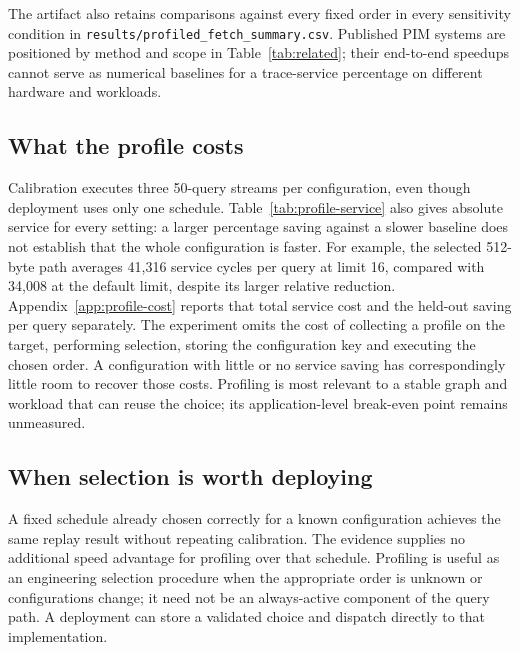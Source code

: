 \begin{table}[htbp]\centering\small
\caption[Profiled path versus measured baselines]{Default memory configuration and expansion boundaries. Mean paired cycle difference (\%) and 95\% interval across ten reference splits. Original, sorted and round-robin use BFS; RCM, Gorder and Porder use their respective placements and original order. The oracle is descriptive and uses held-out outcomes.}\label{tab:profile-baselines}

\end{table}

The artifact also retains comparisons against every fixed order in every sensitivity condition in \texttt{results/profiled\_fetch\_summary.csv}. Published PIM systems are positioned by method and scope in Table~\ref{tab:related}; their end-to-end speedups cannot serve as numerical baselines for a trace-service percentage on different hardware and workloads.

\subsection{What the profile costs}
Calibration executes three 50-query streams per configuration, even though deployment uses only one schedule. Table~\ref{tab:profile-service} also gives absolute service for every setting: a larger percentage saving against a slower baseline does not establish that the whole configuration is faster. For example, the selected 512-byte path averages 41,316 service cycles per query at limit 16, compared with 34,008 at the default limit, despite its larger relative reduction. Appendix~\ref{app:profile-cost} reports that total service cost and the held-out saving per query separately. The experiment omits the cost of collecting a profile on the target, performing selection, storing the configuration key and executing the chosen order. A configuration with little or no service saving has correspondingly little room to recover those costs. Profiling is most relevant to a stable graph and workload that can reuse the choice; its application-level break-even point remains unmeasured.

\subsection{When selection is worth deploying}
\label{sec:profile-deployment}
A fixed schedule already chosen correctly for a known configuration achieves the same replay result without repeating calibration. The evidence supplies no additional speed advantage for profiling over that schedule. Profiling is useful as an engineering selection procedure when the appropriate order is unknown or configurations change; it need not be an always-active component of the query path. A deployment can store a validated choice and dispatch directly to that implementation.

